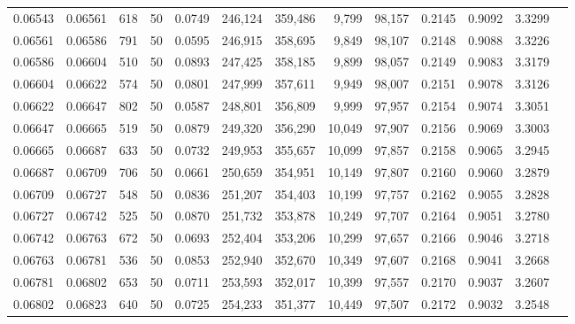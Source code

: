 \begin{tabular}{rrrrrrrrrrrrr}
0.06543 & 0.06561 &   618 &  50 &                                     0.0749 & 246,124 & 359,486 &   9,799 &  98,157 & 0.2145 & 0.9092 & 3.3299 \\
0.06561 & 0.06586 &   791 &  50 &                                     0.0595 & 246,915 & 358,695 &   9,849 &  98,107 & 0.2148 & 0.9088 & 3.3226 \\
0.06586 & 0.06604 &   510 &  50 &                                     0.0893 & 247,425 & 358,185 &   9,899 &  98,057 & 0.2149 & 0.9083 & 3.3179 \\
0.06604 & 0.06622 &   574 &  50 &                                     0.0801 & 247,999 & 357,611 &   9,949 &  98,007 & 0.2151 & 0.9078 & 3.3126 \\
0.06622 & 0.06647 &   802 &  50 &                                     0.0587 & 248,801 & 356,809 &   9,999 &  97,957 & 0.2154 & 0.9074 & 3.3051 \\
0.06647 & 0.06665 &   519 &  50 &                                     0.0879 & 249,320 & 356,290 &  10,049 &  97,907 & 0.2156 & 0.9069 & 3.3003 \\
0.06665 & 0.06687 &   633 &  50 &                                     0.0732 & 249,953 & 355,657 &  10,099 &  97,857 & 0.2158 & 0.9065 & 3.2945 \\
0.06687 & 0.06709 &   706 &  50 &                                     0.0661 & 250,659 & 354,951 &  10,149 &  97,807 & 0.2160 & 0.9060 & 3.2879 \\
0.06709 & 0.06727 &   548 &  50 &                                     0.0836 & 251,207 & 354,403 &  10,199 &  97,757 & 0.2162 & 0.9055 & 3.2828 \\
0.06727 & 0.06742 &   525 &  50 &                                     0.0870 & 251,732 & 353,878 &  10,249 &  97,707 & 0.2164 & 0.9051 & 3.2780 \\
0.06742 & 0.06763 &   672 &  50 &                                     0.0693 & 252,404 & 353,206 &  10,299 &  97,657 & 0.2166 & 0.9046 & 3.2718 \\
0.06763 & 0.06781 &   536 &  50 &                                     0.0853 & 252,940 & 352,670 &  10,349 &  97,607 & 0.2168 & 0.9041 & 3.2668 \\
0.06781 & 0.06802 &   653 &  50 &                                     0.0711 & 253,593 & 352,017 &  10,399 &  97,557 & 0.2170 & 0.9037 & 3.2607 \\
0.06802 & 0.06823 &   640 &  50 &                                     0.0725 & 254,233 & 351,377 &  10,449 &  97,507 & 0.2172 & 0.9032 & 3.2548 \\

\end{tabular}
